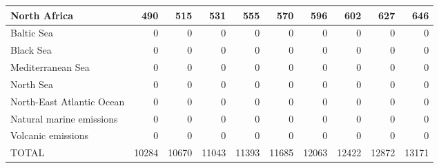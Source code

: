 \begin{table}
\begin{tabular}{|l|r|r|r|r|r|r|r|r|r|}
                  North Africa&    490&    515&    531&    555&    570&    596&    602&    627&    646\\\hline
                    Baltic Sea&      0&      0&      0&      0&      0&      0&      0&      0&      0\\\hline
                     Black Sea&      0&      0&      0&      0&      0&      0&      0&      0&      0\\\hline
             Mediterranean Sea&      0&      0&      0&      0&      0&      0&      0&      0&      0\\\hline
                     North Sea&      0&      0&      0&      0&      0&      0&      0&      0&      0\\\hline
     North-East Atlantic Ocean&      0&      0&      0&      0&      0&      0&      0&      0&      0\\\hline
      Natural marine emissions&      0&      0&      0&      0&      0&      0&      0&      0&      0\\\hline
            Volcanic emissions&      0&      0&      0&      0&      0&      0&      0&      0&      0\\\hline\hline
                         TOTAL&  10284&  10670&  11043&  11393&  11685&  12063&  12422&  12872&  13171\\\hline
 \end{tabular}
 \end{table}
 

